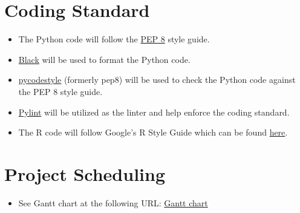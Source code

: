 \documentclass{article}
\begin{document}
\section{Coding Standard}
\begin{itemize}
    \item The Python code will follow the \href{https://peps.python.org/pep-0008/}{PEP 8} style guide.
    \item \href{https://pypi.org/project/black/}{Black} will be used to format the Python code.
    \item \href{https://pypi.org/project/pycodestyle/}{pycodestyle} (formerly pep8) will be used to check the Python code against the PEP 8 style guide.
    \item \href{https://pypi.org/project/pylint/}{Pylint} will be utilized as the linter and help enforce the coding standard.
    \item The R code will follow Google's R Style Guide which can be found \href{https://google.github.io/styleguide/Rguide.html}{here}.
\end{itemize}

\section{Project Scheduling}
\begin{itemize}
    \item See Gantt chart at the following URL:  \href{https://github.com/paezha/PyERT-BLACK/tree/main/docs/Project%20Schedule}{Gantt chart}
\end{itemize}
\end{document}
